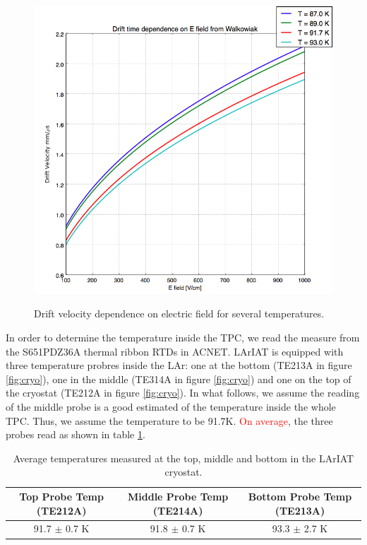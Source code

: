 \begin{figure}[ht!]
\centering
\includegraphics[scale=0.45]{./images/Walkowiak.png}\\
\caption{Drift velocity dependence on electric field for several temperatures.}
\label{fig:EV}
\end{figure}


In order to determine the temperature inside the TPC, we read the measure from the S651PDZ36A thermal ribbon RTDs in ACNET. 
LArIAT is equipped with three temperature probres inside the LAr: one at the bottom (TE213A in figure \ref{fig:cryo}), one in the middle (TE314A in figure \ref{fig:cryo}) and one on the top of the cryostat (TE212A in figure \ref{fig:cryo}). In what follows, we assume the reading of the middle probe is a good estimated of the temperature inside the whole TPC. Thus, we assume the temperature to be 91.7K. \textcolor{red}{On average}, the three probes read as shown in table \ref{tab:temp}. 
\begin{table}[]
\centering
\caption{Average temperatures measured at the top, middle and bottom in the LArIAT cryostat.}
\label{tab:temp}
\begin{tabular}{|c|c|c|}
\hline
Top Probe Temp (TE212A) & Middle Probe Temp (TE214A)   & Bottom Probe Temp (TE213A)  \\ \hline
91.7 $\pm$ 0.7 K &  91.8 $\pm$ 0.7 K                   & 93.3 $\pm$ 2.7 K       \\ \hline
\end{tabular}
\end{table}


